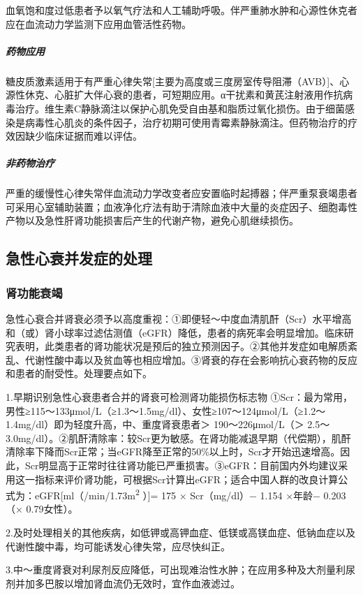 血氧饱和度过低患者予以氧气疗法和人工辅助呼吸。伴严重肺水肿和心源性休克者应在血流动力学监测下应用血管活性药物。

\subparagraph{药物应用}

糖皮质激素适用于有严重心律失常{[}主要为高度或三度房室传导阻滞（AVB）{]}、心源性休克、心脏扩大伴心衰的患者，可短期应用。α干扰素和黄芪注射液用作抗病毒治疗。维生素C静脉滴注以保护心肌免受自由基和脂质过氧化损伤。由于细菌感染是病毒性心肌炎的条件因子，治疗初期可使用青霉素静脉滴注。但药物治疗的疗效因缺少临床证据而难以评估。

\subparagraph{非药物治疗}

严重的缓慢性心律失常伴血流动力学改变者应安置临时起搏器；伴严重泵衰竭患者可采用心室辅助装置；血液净化疗法有助于清除血液中大量的炎症因子、细胞毒性产物以及急性肝肾功能损害后产生的代谢产物，避免心肌继续损伤。

\subsection{急性心衰并发症的处理}

\subsubsection{肾功能衰竭}

急性心衰合并肾衰必须予以高度重视：①即便轻～中度血清肌酐（Scr）水平增高和（或）肾小球率过滤估测值（eGFR）降低，患者的病死率会明显增加。临床研究表明，此类患者的肾功能状况是预后的独立预测因子。②其他并发症如电解质紊乱、代谢性酸中毒以及贫血等也相应增加。③肾衰的存在会影响抗心衰药物的反应和患者的耐受性。处理要点如下。

1.早期识别急性心衰患者合并的肾衰可检测肾功能损伤标志物
①Scr：最为常用，男性≥115～133μmol/L（≥1.3～1.5mg/dl）、女性≥107～124μmol/L（≥1.2～1.4mg/dl）即为轻度升高，中、重度肾衰患者＞
190～226μmol/L（＞
2.5～3.0mg/dl）。②肌酐清除率：较Scr更为敏感。在肾功能减退早期（代偿期），肌酐清除率下降而Scr正常；当eGFR降至正常的50\%以上时，Scr才开始迅速增高。因此，Scr明显高于正常时往往肾功能已严重损害。③eGFR：目前国内外均建议采用这一指标来评价肾功能，可根据Scr计算出eGFR；适合中国人群的改良计算公式为：eGFR{[}ml（/min/1.73m\textsuperscript{2}
）{]}= 175 × Scr（mg/dl）− 1.154 ×年龄− 0.203（× 0.79女性）。

2.及时处理相关的其他疾病，如低钾或高钾血症、低镁或高镁血症、低钠血症以及代谢性酸中毒，均可能诱发心律失常，应尽快纠正。

3.中～重度肾衰对利尿剂反应降低，可出现难治性水肿；在应用多种及大剂量利尿剂并加多巴胺以增加肾血流仍无效时，宜作血液滤过。

